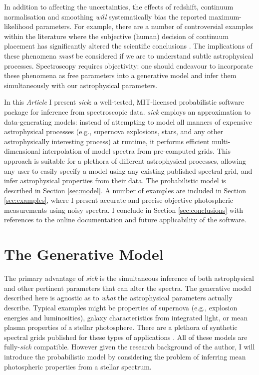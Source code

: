 \documentclass{aastex}
\newcommand{\sick}{\textit{sick}}
\newcommand{\article}{\textit{Article}}
\begin{document}
In addition to affecting the uncertainties, the effects of redshift, continuum normalisation and smoothing \textit{will} systematically bias the reported maximum-likelihood parameters. For example, there are a number of controversial examples within the literature where the subjective (human) decision of continuum placement has significantly altered the scientific conclusions \citep[e.g., see][where this issue is argued in great detail]{kerzendorf}. The implications of these phenomena \textit{must} be considered if we are to understand subtle astrophysical processes. Spectroscopy requires objectivity: one should endeavour to incorporate these phenomena as free parameters into a generative model and infer them simultaneously with our astrophysical parameters.


In this \article{} I present \sick{}: a well-tested, MIT-licensed probabilistic software package for inference from spectroscopic data. \sick{} employs an approximation to data-generating models: instead of attempting to model all manners of expensive astrophysical processes (e.g., supernova explosions, stars, and any other astrophysically interesting process) at runtime, it performs efficient multi-dimensional interpolation of model spectra from pre-computed grids. This approach is suitable for a plethora of different astrophysical processes, allowing any user to easily specify a model using any existing published spectral grid, and infer astrophysical properties from their data. The probabilistic model is described in Section \ref{sec:model}. A number of examples are included in Section \ref{sec:examples}, where I present accurate and precise objective photospheric measurements using noisy spectra. I conclude in Section \ref{sec:conclusions} with references to the online documentation and future applicability of the software.

\section{The Generative Model}

The primary advantage of \sick{} is the simultaneous inference of both astrophysical and other pertinent parameters that can alter the spectra. The generative model described here is agnostic as to \textit{what} the astrophysical parameters actually describe. Typical examples might be properties of supernova (e.g., explosion energies and luminosities), galaxy characteristics from integrated light, or mean plasma properties of a stellar photosphere. There are a plethora of synthetic spectral grids published for these types of applications \citep{who;who;who}. All of these models are fully-\sick{} compatible. However given the research background of the author, I will introduce the probabilistic model by considering the problem of inferring mean photospheric properties from a stellar spectrum. 
\end{document}
